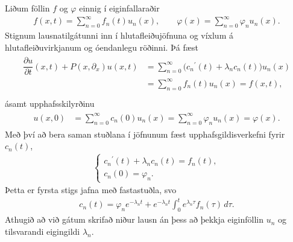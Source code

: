 \documentclass[a4paper,10pt,icelandic]{sphinxmanual}
\begin{document}
Liðum föllin \(f\) og \(\varphi\) einnig í eiginfallaraðir
\begin{equation*}
\begin{split}f(x,t)=\sum\limits_{n=0}^{\infty} f_n(t)u_n(x), \qquad
 \varphi(x)=\sum\limits_{n=0}^{\infty} \varphi_nu_n(x).\end{split}
\end{equation*}
Stignum lausnatilgátunni inn í hlutafleiðujöfnuna og víxlum á hlutafleiðuvirkjanum og óendanlegu röðinni. Þá fæst
\begin{equation*}
\begin{split}\begin{aligned}
 \dfrac{{\partial}u}{{\partial} t}(x,t) +P(x,{\partial}_x)u(x,t)&= \sum\limits_{n=0}^{\infty}\bigg(
 c_n{{^{\prime}}}(t)+{\lambda}_nc_n(t)\bigg)u_n(x)\nonumber\\
 &=\sum\limits_{n=0}^{\infty} f_n(t)u_n(x)=f(x,t),\nonumber\\
 \end{aligned}\end{split}
\end{equation*}
ásamt upphafsskilyrðinu
\begin{equation*}
\begin{split} \begin{aligned}
 u(x,0)&=\sum\limits_{n=0}^{\infty} c_n(0)u_n(x)
=\sum\limits_{n=0}^{\infty} {\varphi}_nu_n(x)={\varphi}(x).\nonumber\end{aligned}\end{split}
\end{equation*}
Með því að bera saman stuðlana í jöfnunum fæst upphafsgildisverkefni fyrir \(c_n(t)\),
\begin{equation*}
\begin{split}\begin{cases}
 c_n{{^{\prime}}}(t)+{\lambda}_nc_n(t)=f_n(t),\\
 c_n(0)={\varphi}_n.
 \end{cases}\end{split}
\end{equation*}
Þetta er fyrsta stigs jafna með fastastuðla, svo
\begin{equation*}
\begin{split}c_n(t)={\varphi}_ne^{-{\lambda}_n t}+
 e^{-{\lambda}_n t}\int_0^te^{{\lambda}_n {\tau}}f_n({\tau})\, d{\tau}.\end{split}
\end{equation*}
Athugið að við gátum skrifað niður lausn án þess að þekkja eiginföllin \(u_n\) og tilsvarandi eigingildi \(\lambda_n\).
\end{document}
